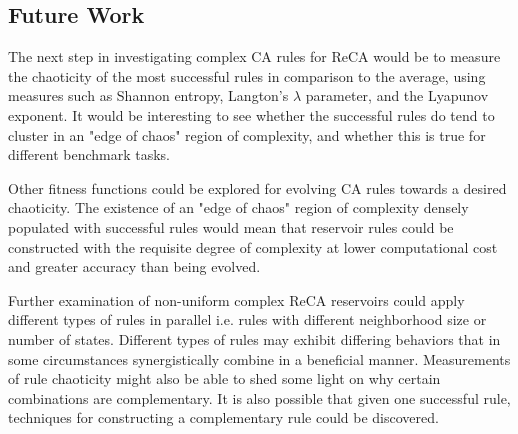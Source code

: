 \documentclass{elsarticle}
\begin{document}
\begin{multicols}{2}
	\section{Future Work}\label{future_work}
	The next step in investigating complex CA rules for ReCA would be to measure 
	the chaoticity of the most successful rules in comparison to the average, using 
	measures such as Shannon entropy, Langton's $\lambda$ parameter, and the 
	Lyapunov exponent. It would be interesting to see whether the successful rules 
	do tend to cluster in an "edge of chaos" region of complexity, and whether this
	is true for different benchmark tasks. \par Other fitness functions could be 
	explored for evolving CA rules towards a desired chaoticity. The existence of 
	an "edge of chaos" region of complexity densely populated with successful rules 
	would mean that reservoir rules could be constructed with the requisite degree 
	of complexity at lower computational cost and greater accuracy than being 
	evolved.  \par Further examination of non-uniform complex ReCA reservoirs could 
	apply different types of rules in parallel i.e.  rules with different 
	neighborhood size or number of states.  Different types of rules may exhibit 
	differing behaviors that in some circumstances synergistically combine in a 
	beneficial manner.  Measurements of rule chaoticity might also be able to shed 
	some light on why certain combinations are complementary. It is also possible 
	that given one successful rule, techniques for constructing a complementary 
	rule could be discovered.
	
	\fi
	

\end{multicols}
\end{document}
